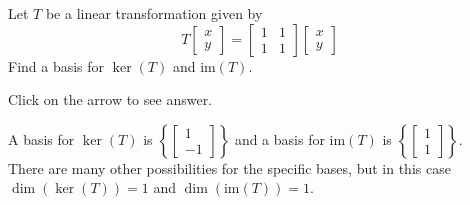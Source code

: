 \documentclass{ximera}
\begin{document}



\begin{problem}\label{prb:6.28}
 Let $T$ be a linear transformation given by
\[
T \left[ \begin{array}{r}
x\\
y
\end{array}\right] = \left[ \begin{array}{rrr}
1 &1  \\
1 & 1
\end{array}\right]
\left[ \begin{array}{r}
x\\
y
\end{array}\right]
\]
Find a basis for $\ker \left( T\right)$ and $\mbox{im} \left( T\right) $.

Click on the arrow to see answer.
\begin{expandable}
A basis for $\ker \left( T\right)$ is
$\left\{ \left[
\begin{array}{r}
1 \\
-1
\end{array}
\right] \right\}$
and a basis for $\mbox{im} \left( T\right)$ is
$\left\{ \left[
\begin{array}{r}
1 \\
1
\end{array}
\right] \right\}$. \\
There are many other possibilities for the specific bases, but in this case
$\dim \left( \ker \left( T\right) \right)=1 $ and $\dim \left( \mbox{im} \left( T\right) \right)=1$.
\end{expandable}

\end{problem}
\end{document}
